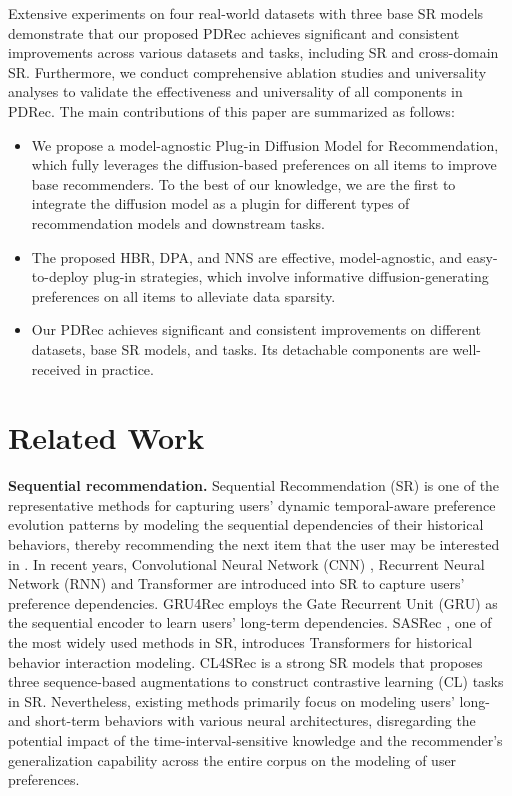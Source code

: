 \documentclass[letterpaper]{article} %
\begin{document}
Extensive experiments on four real-world datasets with three base SR models demonstrate that our proposed PDRec achieves significant and consistent improvements across various datasets and tasks, including SR and cross-domain SR. Furthermore, we conduct comprehensive ablation studies and universality analyses to validate the effectiveness and universality of all components in PDRec.
The main contributions of this paper are summarized as follows:
\begin{itemize}[leftmargin=*, topsep=0.2pt,parsep=0pt]
  \item We propose a model-agnostic Plug-in Diffusion Model for Recommendation, which fully leverages the diffusion-based preferences on all items to improve base recommenders. To the best of our knowledge, we are the first to integrate the diffusion model as a plugin for different types of recommendation models and downstream tasks.
  \item The proposed HBR, DPA, and NNS are effective, model-agnostic, and easy-to-deploy plug-in strategies, which involve informative diffusion-generating preferences on all items to alleviate data sparsity.
  \item Our PDRec achieves significant and consistent improvements on different datasets, base SR models, and tasks. Its detachable components are well-received in practice.
\end{itemize}

\section{Related Work}
\textbf{Sequential recommendation.}
Sequential Recommendation (SR) is one of the representative methods for capturing users' dynamic temporal-aware preference evolution patterns by modeling the sequential dependencies of their historical behaviors, thereby recommending the next item that the user may be interested in \cite{MLP4Rec}. 
In recent years, Convolutional Neural Network (CNN) \cite{RCNN, Caser}, Recurrent Neural Network (RNN) \cite{NARM, GRU4Rec} and Transformer \cite{BERT4Rec, SASRec} are introduced into SR to capture users' preference dependencies. GRU4Rec \cite{GRU4Rec} employs the Gate Recurrent Unit (GRU) as the sequential encoder to learn users' long-term dependencies. SASRec \cite{SASRec}, one of the most widely used methods in SR, introduces Transformers for historical behavior interaction modeling. 
CL4SRec \cite{CL4SRec} is a strong SR models that proposes three sequence-based augmentations to construct contrastive learning (CL) tasks in SR. Nevertheless, existing methods primarily focus on modeling users' long- and short-term behaviors with various neural architectures, disregarding the potential impact of the time-interval-sensitive knowledge and the recommender's generalization capability across the entire corpus on the modeling of user preferences.
\end{document}
